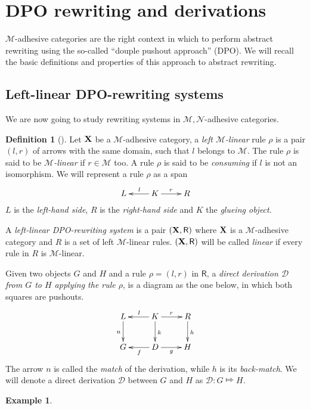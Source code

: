 \documentclass[a4paper]{article}
\def\R{\mathsf{R}}
\def\X{\textbf {\textup{X}}}
\newcommand{\dder}[1]{\mathscr{#1}}
\theoremstyle{definition}
\newtheorem{definition}[theorem]{Definition}
\newtheorem{example}[theorem]{Example}
\begin{document}
\section{DPO rewriting and derivations}

$\mathcal{M}$-adhesive categories are the right context in which to perform abstract rewriting using the so-called ``douple pushout approach'' (DPO). We will recall the basic definitions and properties of this approach to abstract rewriting. 

\subsection{Left-linear DPO-rewriting systems}
We are now going to study rewriting systems in $\mathcal{M}, \mathcal{N}$-adhesive categories.

\begin{definition}[\cite{habel2012mathcal,heindel2009category}]
	Let $\X$ be a $\mathcal{M}$-adhesive category, a  \emph{left $\mathcal{M}$-linear} rule $\rho$ is a pair $(l,r)$ of arrows with the same domain, such that $l$ belongs to $\mathcal{M}$.  The rule $\rho$ is said to be \emph{$\mathcal{M}$-linear} if $r\in \mathcal{M}$ too. A rule $\rho$ is said to be \emph{consuming} if $l$ is not an isomorphism. We will represent a rule $\rho$ as a span 
	\[\xymatrix{L & K\ar[l]_{l} \ar[r]^{r} & R}\]
$L$ is the \emph{left-hand side}, $R$ is the \emph{right-hand side} and $K$ the \emph{glueing object}. 


A \emph{left-linear DPO-rewriting system} is a pair $(\X, \R)$ where $\X$ is a $\mathcal{M}$-adhesive category and $R$ is a set of left $\mathcal{M}$-linear rules. $(\X, \R)$ will be called \emph{linear} if every rule in $R$ is $\mathcal{M}$-linear.

Given  two objects $G$ and $H$ and a rule $\rho=(l,r)$ in $\R$, a \emph{direct derivation $\mathscr{D}$ from $G$ to $H$ applying the rule $\rho$}, is a diagram as the one below, in which both squares are pushouts. 
	\[\xymatrix{L \ar[d]_{n}& K \ar[d]^{k}\ar[l]_{l} \ar[r]^{r} & R \ar[d]^{h}\\G & \ar[l]^{f} D \ar[r]_{g}& H}\]
	The arrow $n$ is called the \emph{match} of the derivation, while $h$ is its \emph{back-match}.
	We will denote a direct derivation $\dder{D}$ between $G$ and $H$ as $\dder{D}\colon G\Mapsto H$. 
\end{definition}

\begin{example}
\end{example}
\end{document}
